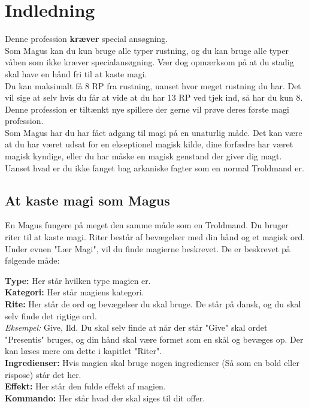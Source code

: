 \chapter{Indledning}

Denne profession \textbf{kræver} special ansøgning.\\
Som Magus kan du kun bruge alle typer rustning, og du kan bruge alle typer våben som ikke kræver specialansøgning. Vær dog opmærksom på at du stadig skal have en hånd fri til at kaste magi.\\
Du kan maksimalt få 8 RP fra rustning, uanset hvor meget rustning du har. Det vil sige at selv hvis du får at vide at du har 13 RP ved tjek ind, så har du kun 8.\\

Denne profession er tiltænkt nye spillere der gerne vil prøve deres første magi profession.\\

Som Magus har du har fået adgang til magi på en unaturlig måde. Det kan være at du har været udsat for en ekseptionel magisk kilde, dine forfædre har været magisk kyndige, eller du har måske en magisk genstand der giver dig magt. Uanset hvad er du ikke fanget bag arkaniske fagter som en normal Troldmand er.



\section{At kaste magi som Magus} 

En Magus fungere på meget den samme måde som en Troldmand. Du bruger riter til at kaste magi. Riter består af bevægelser med din hånd og et magisk ord. Under evnen "Lær Magi", vil du finde magierne beskrevet. De er beskrevet på følgende måde:
\begin{lærmagi*}
\textbf{Type:} Her står hvilken type magien er.\\
\textbf{Kategori:} Her står magiens kategori.\\
\textbf{Rite:} Her står de ord og bevægelser du skal bruge. De står på dansk, og du skal selv finde det rigtige ord.\\
\textit{Eksempel:} Give, Ild. Du skal selv finde at når der står "Give" skal ordet "Presentis" bruges, og din hånd skal være formet som en skål og bevæges op. Der kan læses mere om dette i kapitlet "Riter".\\
\textbf{Ingredienser:} Hvis magien skal bruge nogen ingredienser (Så som en bold eller rispose) står det her.\\
\textbf{Effekt:} Her står den fulde effekt af magien.\\
\textbf{Kommando:} Her står hvad der skal siges til dit offer.\\
\end{lærmagi*}


